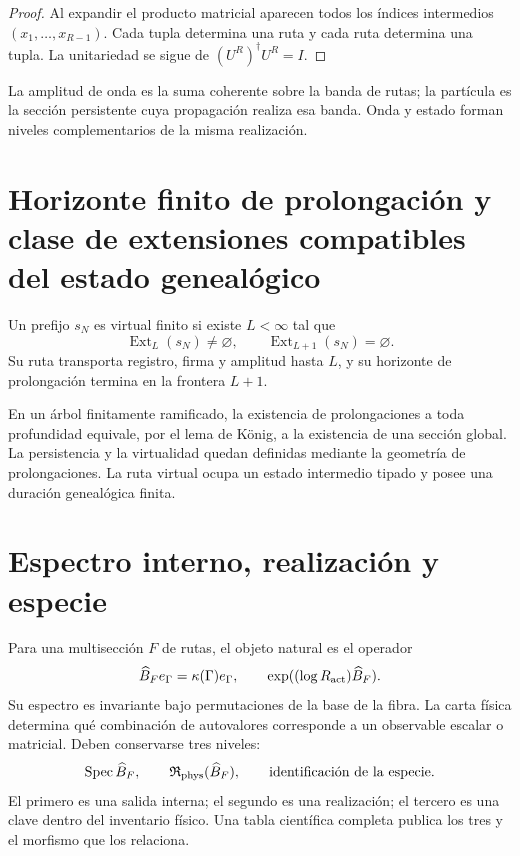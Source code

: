 \begin{proof}
Al expandir el producto matricial aparecen todos los índices intermedios
\((x_1,\ldots,x_{R-1})\). Cada tupla determina una ruta y cada ruta determina
una tupla. La unitariedad se sigue de
\((U^R)^\dagger U^R=I\).
\end{proof}

La amplitud de onda es la suma coherente sobre la banda de rutas; la
partícula es la sección persistente cuya propagación realiza esa banda. Onda
y estado forman niveles complementarios de la misma realización.

\section{Horizonte finito de prolongación y clase de extensiones compatibles del estado genealógico}

\begin{definition}
\label{def:ruta-virtual-finita-bisagra}
Un prefijo \(s_N\) es virtual finito si existe \(L<\infty\) tal que
\[
 \operatorname{Ext}_L(s_N)\neq\varnothing,
 \qquad
 \operatorname{Ext}_{L+1}(s_N)=\varnothing.
\]
Su ruta transporta registro, firma y amplitud hasta \(L\), y su horizonte de
prolongación termina en la frontera \(L+1\).
\end{definition}

En un árbol finitamente ramificado, la existencia de prolongaciones a toda
profundidad equivale, por el lema de König, a la existencia de una sección
global. La persistencia y la virtualidad quedan definidas mediante la
geometría de prolongaciones. La ruta virtual ocupa un estado intermedio
tipado y posee una duración genealógica finita.

\section{Espectro interno, realización y especie}

Para una multisección \(F\) de rutas, el objeto natural es el operador
\[
 \widehat B_F e_\Gamma
 =\kappa(\Gamma)e_\Gamma,
 \qquad
 \exp((\log R_{\rm act})\widehat B_F).
\]
Su espectro es invariante bajo permutaciones de la base de la fibra. La carta
física determina qué combinación de autovalores corresponde a un observable
escalar o matricial. Deben conservarse tres niveles:
\[
 \operatorname{Spec}\widehat B_F,
 \qquad
 \mathfrak R_{\rm phys}(\widehat B_F),
 \qquad
 \text{identificación de la especie}.
\]
El primero es una salida interna; el segundo es una realización; el tercero
es una clave dentro del inventario físico. Una tabla científica completa
publica los tres y el morfismo que los relaciona.

